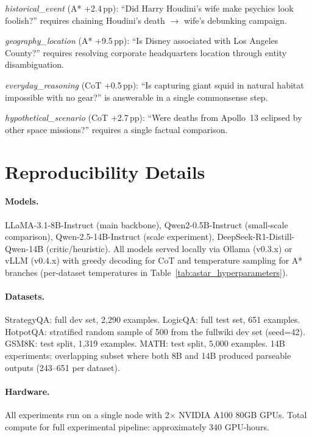 \documentclass[11pt]{article}
\begin{document}
\emph{historical\_event} (A* +2.4\,pp): ``Did Harry Houdini's wife make psychics look foolish?'' requires chaining Houdini's death $\to$ wife's debunking campaign.

\emph{geography\_location} (A* +9.5\,pp): ``Is Disney associated with Los Angeles County?'' requires resolving corporate headquarters location through entity disambiguation.

\emph{everyday\_reasoning} (CoT +0.5\,pp): ``Is capturing giant squid in natural habitat impossible with no gear?'' is answerable in a single commonsense step.

\emph{hypothetical\_scenario} (CoT +2.7\,pp): ``Were deaths from Apollo~13 eclipsed by other space missions?'' requires a single factual comparison.

\section{Reproducibility Details}
\label{app:reproducibility}

\paragraph{Models.} LLaMA-3.1-8B-Instruct (main backbone), Qwen2-0.5B-Instruct (small-scale comparison), Qwen-2.5-14B-Instruct (scale experiment), DeepSeek-R1-Distill-Qwen-14B (critic/heuristic). All models served locally via Ollama (v0.3.x) or vLLM (v0.4.x) with greedy decoding for CoT and temperature sampling for A* branches (per-dataset temperatures in Table~\ref{tab:astar_hyperparameters}).

\paragraph{Datasets.} StrategyQA: full dev set, 2{,}290 examples. LogicQA: full test set, 651 examples. HotpotQA: stratified random sample of 500 from the fullwiki dev set (seed=42). GSM8K: test split, 1{,}319 examples. MATH: test split, 5{,}000 examples. 14B experiments: overlapping subset where both 8B and 14B produced parseable outputs (243--651 per dataset).

\paragraph{Hardware.} All experiments run on a single node with 2$\times$ NVIDIA A100 80GB GPUs. Total compute for full experimental pipeline: approximately 340 GPU-hours.
\end{document}
